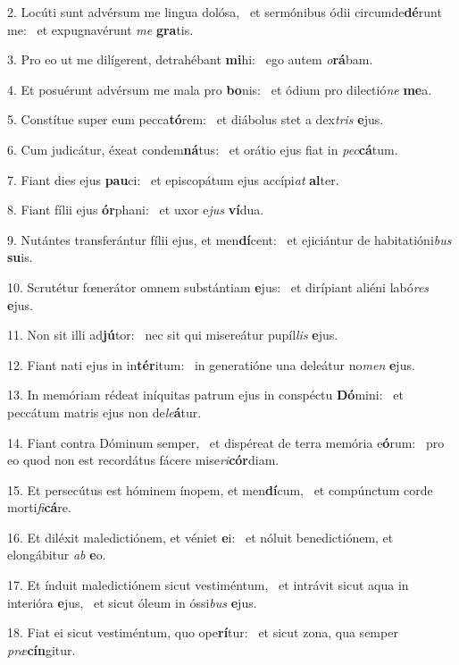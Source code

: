 2. Locúti sunt advérsum me lingua dolósa, \dag\  et sermónibus ódii circumde\textbf{dé}runt me: \ast\  et expugnavérunt \textit{me} \textbf{gra}tis.\

3. Pro eo ut me dilígerent, detrahébant \textbf{mi}hi: \ast\  ego autem \textit{o}\textbf{rá}bam.\

4. Et posuérunt advérsum me mala pro \textbf{bo}nis: \ast\  et ódium pro dilectió\textit{ne} \textbf{me}a.\

5. Constítue super eum pecca\textbf{tó}rem: \ast\  et diábolus stet a dex\textit{tris} \textbf{e}jus.\

6. Cum judicátur, éxeat condem\textbf{ná}tus: \ast\  et orátio ejus fiat in \textit{pec}\textbf{cá}tum.\

7. Fiant dies ejus \textbf{pau}ci: \ast\  et episcopátum ejus accípi\textit{at} \textbf{al}ter.\

8. Fiant fílii ejus \textbf{ór}phani: \ast\  et uxor e\textit{jus} \textbf{ví}dua.\

9. Nutántes transferántur fílii ejus, et men\textbf{dí}cent: \ast\  et ejiciántur de habitatióni\textit{bus} \textbf{su}is.\

10. Scrutétur fœnerátor omnem substántiam \textbf{e}jus: \ast\  et dirípiant aliéni labó\textit{res} \textbf{e}jus.\

11. Non sit illi ad\textbf{jú}tor: \ast\  nec sit qui misereátur pupíl\textit{lis} \textbf{e}jus.\

12. Fiant nati ejus in in\textbf{tér}itum: \ast\  in generatióne una deleátur no\textit{men} \textbf{e}jus.\

13. In memóriam rédeat iníquitas patrum ejus in conspéctu \textbf{Dó}mini: \ast\  et peccátum matris ejus non de\textit{le}\textbf{á}tur.\

14. Fiant contra Dóminum semper, \dag\  et dispéreat de terra memória e\textbf{ó}rum: \ast\  pro eo quod non est recordátus fácere mise\textit{ri}\textbf{cór}diam.\

15. Et persecútus est hóminem ínopem, et men\textbf{dí}cum, \ast\  et compúnctum corde morti\textit{fi}\textbf{cá}re.\

16. Et diléxit maledictiónem, et véniet \textbf{e}i: \ast\  et nóluit benedictiónem, et elongábitur \textit{ab} \textbf{e}o.\

17. Et índuit maledictiónem sicut vestiméntum, \dag\  et intrávit sicut aqua in interióra \textbf{e}jus, \ast\  et sicut óleum in óssi\textit{bus} \textbf{e}jus.\

18. Fiat ei sicut vestiméntum, quo ope\textbf{rí}tur: \ast\  et sicut zona, qua semper \textit{præ}\textbf{cín}gitur.\

